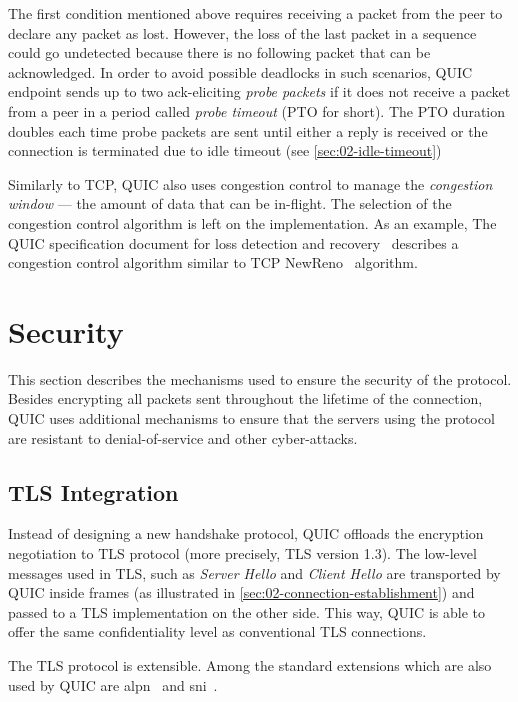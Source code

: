 The first condition mentioned above requires receiving a packet from the peer to declare any packet
as lost. However, the loss of the last packet in a sequence could go undetected because there is no
following packet that can be acknowledged. In order to avoid possible deadlocks in such scenarios,
QUIC endpoint sends up to two ack-eliciting \textit{probe packets} if it does not receive a packet
from a peer in a period called \textit{probe timeout} (PTO for short). The PTO duration doubles each
time probe packets are sent until either a reply is received or the connection is terminated due to
idle timeout (see \autoref{sec:02-idle-timeout})

Similarly to TCP, QUIC also uses congestion control to manage the \textit{congestion window} --- the
amount of data that can be in-flight. The selection of the congestion control algorithm is left on
the implementation. As an example, The QUIC specification document for loss detection and
recovery~\cite[Section~7]{draft-ietf-quic-recovery} describes a congestion control algorithm similar
to TCP NewReno~\cite{rfc6582} algorithm.

\section{Security}

This section describes the mechanisms used to ensure the security of the protocol. Besides
encrypting all packets sent throughout the lifetime of the connection, QUIC uses additional
mechanisms to ensure that the servers using the protocol are resistant to denial-of-service and
other cyber-attacks.

\subsection{TLS Integration}

Instead of designing a new handshake protocol, QUIC offloads the encryption negotiation to TLS
protocol (more precisely, TLS version 1.3). The low-level messages used in TLS, such as
\textit{Server Hello} and \textit{Client Hello} are transported by QUIC inside \CRYPTO{} frames (as
illustrated in \autoref{sec:02-connection-establishment}) and passed to a TLS implementation on the
other side. This way, QUIC is able to offer the same confidentiality level as conventional TLS
connections.

The TLS protocol is extensible. Among the standard extensions which are also used by QUIC are
\gls{alpn}~\cite{rfc7301} and \gls{sni}~\cite{rfc6066}.

